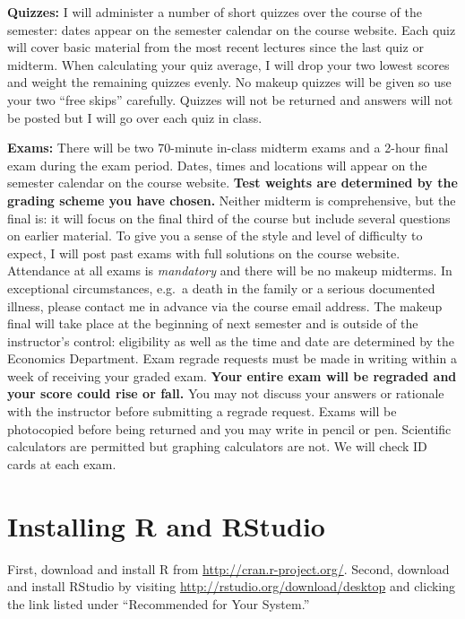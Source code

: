 \documentclass[11pt, letterpaper]{article}
\begin{document}
\medskip

\noindent \textbf{Quizzes:} 
I will administer a number of short quizzes over the course of the semester: dates appear on the semester calendar on the course website.
Each quiz will cover basic material from the most recent lectures since the last quiz or midterm. 
When calculating your quiz average, I will drop your two lowest scores and weight the remaining quizzes evenly. 
No makeup quizzes will be given so use your two ``free skips'' carefully.
Quizzes will not be returned and answers will not be posted but I will go over each quiz in class.

\medskip

\noindent \textbf{Exams:} 
There will be two 70-minute in-class midterm exams and a 2-hour final exam during the exam period.
Dates, times and locations will appear on the semester calendar on the course website.
\textbf{Test weights are determined by the grading scheme you have chosen.}
Neither midterm is comprehensive, but the final is: it will focus on the final third of the course but include several questions on earlier material.
To give you a sense of the style and level of difficulty to expect, I will post past exams with full solutions on the course website.
Attendance at all exams is \emph{mandatory} and there will be no makeup midterms.
In exceptional circumstances, e.g.\ a death in the family or a serious documented illness, please contact me in advance via the course email address.
The makeup final will take place at the beginning of next semester and is outside of the instructor's control: eligibility as well as the time and date are determined by the Economics Department. 
Exam regrade requests must be made in writing within a week of receiving your graded exam. 
\textbf{Your entire exam will be regraded and your score could rise or fall.}
You may not discuss your answers or rationale with the instructor before submitting a regrade request. 
Exams will be photocopied before being returned and you may write in pencil or pen. 
Scientific calculators are permitted but graphing calculators are not. 
We will check ID cards at each exam.

\medskip

\section*{Installing R and RStudio} First, download and install R from \url{http://cran.r-project.org/}. Second, download and install RStudio by visiting \url{http://rstudio.org/download/desktop} and clicking the link listed under ``Recommended for Your System.'' 
\end{document}
